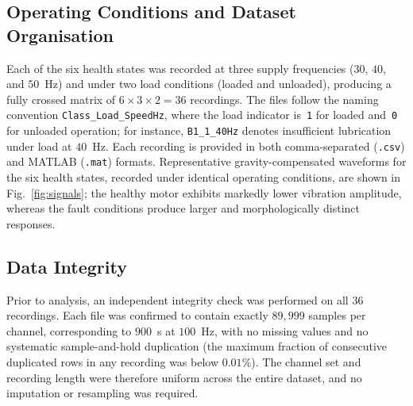 \subsection{Operating Conditions and Dataset Organisation}
Each of the six health states was recorded at three supply frequencies
($30$, $40$, and $50$~Hz) and under two load conditions (loaded and unloaded),
producing a fully crossed matrix of $6\times3\times2 = 36$ recordings. The files
follow the naming convention \texttt{Class\_Load\_SpeedHz}, where the load
indicator is~\texttt{1} for loaded and~\texttt{0} for unloaded operation; for
instance, \texttt{B1\_1\_40Hz} denotes insufficient lubrication under load at
$40$~Hz. Each recording is provided in both comma-separated (\texttt{.csv}) and
MATLAB (\texttt{.mat}) formats. Representative gravity-compensated waveforms for
the six health states, recorded under identical operating conditions, are shown
in Fig.~\ref{fig:signals}; the healthy motor exhibits markedly lower vibration
amplitude, whereas the fault conditions produce larger and morphologically
distinct responses.

\subsection{Data Integrity}
Prior to analysis, an independent integrity check was performed on all $36$
recordings. Each file was confirmed to contain exactly $89{,}999$ samples per
channel, corresponding to $900$~s at $100$~Hz, with no missing values and no
systematic sample-and-hold duplication (the maximum fraction of consecutive
duplicated rows in any recording was below $0.01\%$). The channel set and
recording length were therefore uniform across the entire dataset, and no
imputation or resampling was required.

